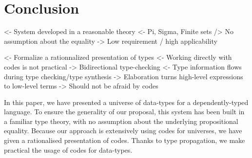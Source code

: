 \documentclass[preprint
              , authoryear
              ]{sigplanconf}
\newenvironment{wstructure}{\comment}{\endcomment}
\begin{document}












\section{Conclusion}

\begin{wstructure}
<- System developed in a reasonable theory
    <- Pi, Sigma, Finite sets
    /> No assumption about the equality
    -> Low requirement / high applicability
\end{wstructure}

\begin{wstructure}
<- Formalize a rationnalized presentation of types
    <- Working directly with codes is not practical
    -> Bidirectional type-checking
        <- Type information flows during type checking/type synthesis
        -> Elaboration turns high-level expressions to low-level terms
    -> Should not be afraid by codes
\end{wstructure}

In this paper, we have presented a universe of data-types for a
dependently-typed language. To ensure the generality of our proposal,
this system has been built in a familiar type theory, with no
assumption about the underlying propositional equality. Because our
approach is extensively using codes for universes, we have given a
rationalised presentation of codes. Thanks to type propagation, we
make practical the usage of codes for data-types.
\end{document}
